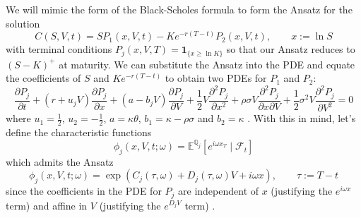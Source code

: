 We will mimic the form of the Black-Scholes formula to form the Ansatz for the solution
\begin{equation}
C(S, V, t) = SP_1(x, V, t) - Ke^{-r(T-t)}P_2(x, V, t), \qquad x := \ln S
\label{eq:heston_ansatz}
\end{equation}
with terminal conditions $P_j(x, V, T) = \boldsymbol{1}_{\{x \ge \ln K\}}$ so that our Ansatz reduces to $(S-K)^+$ at maturity. We can substitute the Ansatz into the PDE and equate the coefficients of $S$ and $Ke^{-r(T-t)}$ to obtain two PDEs for $P_1$ and $P_2$:
\begin{equation}
    \frac{\partial P_j}{\partial t} + (r + u_jV) \frac{\partial P_j}{\partial x} + (a - b_j V) \frac{\partial P_j}{\partial V} + \frac 12 V \frac{\partial^2P_j}{\partial x^2} + \rho \sigma V \frac{\partial^2 P_j}{\partial x \partial V} + \frac 12 \sigma^2 V \frac{\partial^2 P_j}{\partial V^2} = 0
\end{equation}
where $u_1 = \frac 12$, $u_2 = -\frac 12$, $a = \kappa\theta$, $b_1 = \kappa - \rho \sigma$ and $b_2 = \kappa$ \cite{heston1993closed}. With this in mind, let's define the characteristic functions
\begin{equation}
    \phi_j(x, V, t; \omega) = \mathbb E^{\mathbb Q_j}\left[e^{i\omega x_T}\mid \mathcal F_t\right]
\end{equation}
which admits the Ansatz
\begin{equation}
    \phi_j(x, V, t; \omega) = \exp\left(C_j(\tau, \omega) + D_j(\tau, \omega) V + i \omega x\right), \qquad \tau := T-t
\end{equation}
since the coefficients in the PDE for $P_j$ are independent of $x$ (justifying the $e^{i\omega x}$ term) and affine in $V$ (justifying the $e^{D_j V}$ term) \cite{duffie2000transform}.


